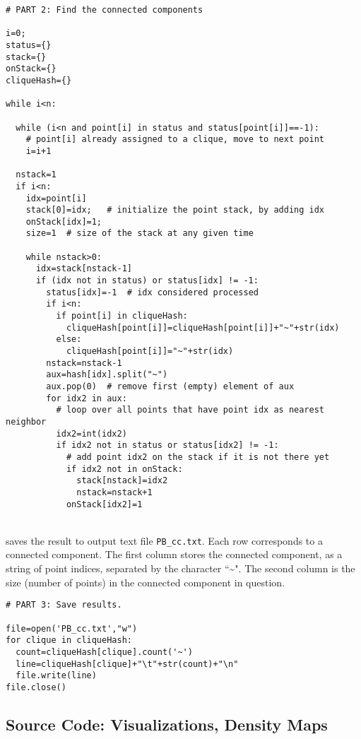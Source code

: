 \documentclass[10pt]{article}
\begin{document}
\begin{lstlisting}
# PART 2: Find the connected components 

i=0;
status={}
stack={}
onStack={}
cliqueHash={}

while i<n:

  while (i<n and point[i] in status and status[point[i]]==-1):  
    # point[i] already assigned to a clique, move to next point
    i=i+1

  nstack=1
  if i<n:
    idx=point[i]
    stack[0]=idx;   # initialize the point stack, by adding idx 
    onStack[idx]=1;
    size=1  # size of the stack at any given time

    while nstack>0:  
      idx=stack[nstack-1]
      if (idx not in status) or status[idx] != -1: 
        status[idx]=-1  # idx considered processed
        if i<n:  
          if point[i] in cliqueHash:
            cliqueHash[point[i]]=cliqueHash[point[i]]+"~"+str(idx)
          else: 
            cliqueHash[point[i]]="~"+str(idx)
        nstack=nstack-1 
        aux=hash[idx].split("~")
        aux.pop(0)  # remove first (empty) element of aux
        for idx2 in aux:
          # loop over all points that have point idx as nearest neighbor
          idx2=int(idx2)
          if idx2 not in status or status[idx2] != -1:   
            # add point idx2 on the stack if it is not there yet
            if idx2 not in onStack: 
              stack[nstack]=idx2
              nstack=nstack+1
            onStack[idx2]=1
\end{lstlisting}
\quad \\
 saves the result to output text file \texttt{PB\_cc.txt}. Each row corresponds to a connected component. The
first column stores the connected component, as a string of point indices, separated by the character ``\textasciitilde". The second column is the size (number of points)
in the connected component in question.

\begin{lstlisting}
# PART 3: Save results.

file=open('PB_cc.txt',"w")
for clique in cliqueHash:
  count=cliqueHash[clique].count('~') 
  line=cliqueHash[clique]+"\t"+str(count)+"\n"
  file.write(line)
file.close()
\end{lstlisting}

\subsection{Source Code: Visualizations, Density Maps}\label{visusc}
\end{document}
